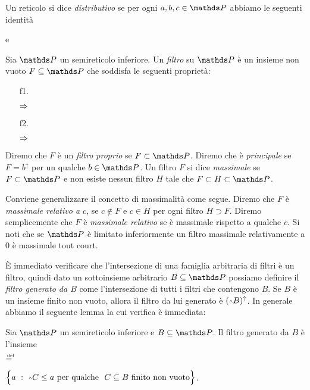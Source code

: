 Un reticolo si dice \emph{distributivo\/} se per ogni $a,b,c\in\PP$ abbiamo le seguenti identit\`a

\parbox{20ex}{\hfill e}



Sia $\PP$ un semireticolo inferiore. Un \emph{filtro\/} su $\PP$ \`e un insieme non vuoto $F\subseteq \PP$ che soddisfa le seguenti propriet\`a:
\def\ceq#1#2#3{\hspace*{7ex}\llap{#1}\parbox{6ex}{\hfil#2}\rlap{#3}}
\begin{itemize}
\item[f1.] \ceq{$a\in F$}{$\Rightarrow$}{$a^\uparrow\subseteq F$;}
\item[f2.] \ceq{$a, b\in F$}{$\Rightarrow$}{$a\swedge  b\in F$.}
\end{itemize}
Diremo che $F$ \`e un \emph{filtro proprio\/} se $F\subset \PP$. Diremo che \`e \emph{principale\/} se $F=b^\uparrow$ per un qualche $b\in \PP$. Un filtro $F$ si dice \emph{massimale\/} se $F\subset \PP$ e non esiste nessun filtro $H$ tale che $F\subset H\subset \PP$. 

Conviene generalizzare il concetto di massimalit\`a come segue. Diremo che $F$ \`e \emph{massimale relativo a $c$\/}, se $c\notin F$ e $c\in H$ per ogni filtro $H\supset F$. Diremo semplicemente che $F$ \`e \emph{massimale relativo\/} se \`e massimale rispetto a qualche $c$. Si noti che se $\PP$ \`e limitato inferiormente un filtro massimale relativamente a $0$ \`e massimale tout court.

\`E immediato verificare che l'intersezione di una famiglia arbitraria di filtri \`e un filtro, quindi dato un sottoinsieme arbitrario $B\subseteq \PP$ possiamo definire il \emph{filtro generato da $B$\/} come l'intersezione di tutti i filtri che contengono $B$. Se $B$ \`e un insieme finito non vuoto, allora il filtro da lui generato \`e $(\swedge B)^\uparrow$. In generale abbiamo il seguente lemma la cui verifica \`e immediata: 

\begin{lemma} \label{proppfgen}
Sia $\PP$ un semireticolo inferiore e $B\subseteq \PP$. Il filtro generato da $B$ \`e l'insieme

\def\ceq#1#2#3{\hspace*{15ex}\llap{#1}\parbox{6ex}{\hfil#2}{#3}}
\ceq{$F$}{{\rm$\deq$}}{$\Big\{a\ :\ \swedge C\le a\ \textrm{per qualche }\ C\subseteq B\textrm{ finito non vuoto}\Big\}$}.\QED
\end{lemma}

